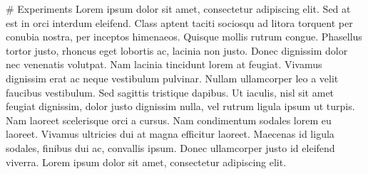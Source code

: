  \# Experiments Lorem ipsum dolor sit amet,
consectetur adipiscing elit. Sed at est in orci interdum eleifend. Class
aptent taciti sociosqu ad litora torquent per conubia nostra, per
inceptos himenaeos. Quisque mollis rutrum congue. Phasellus tortor
justo, rhoncus eget lobortis ac, lacinia non justo. Donec dignissim
dolor nec venenatis volutpat. Nam lacinia tincidunt lorem at feugiat.
Vivamus dignissim erat ac neque vestibulum pulvinar. Nullam ullamcorper
leo a velit faucibus vestibulum. Sed sagittis tristique dapibus. Ut
iaculis, nisl sit amet feugiat dignissim, dolor justo dignissim nulla,
vel rutrum ligula ipsum ut turpis. Nam laoreet scelerisque orci a
cursus. Nam condimentum sodales lorem eu laoreet. Vivamus ultricies dui
at magna efficitur laoreet. Maecenas id ligula sodales, finibus dui ac,
convallis ipsum. Donec ullamcorper justo id eleifend viverra. Lorem
ipsum dolor sit amet, consectetur adipiscing elit.

